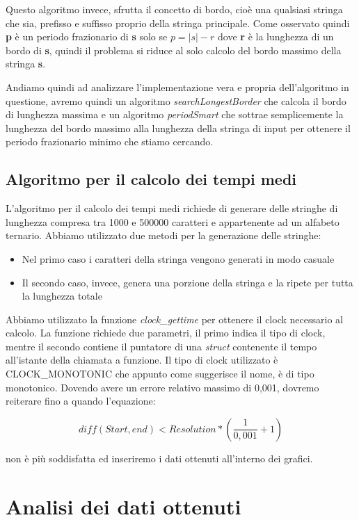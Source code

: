 \documentclass[a4paper,titlepage]{article}
\begin{document}
Questo algoritmo invece, sfrutta il concetto di bordo, cioè una qualsiasi stringa che sia, prefisso e suffisso proprio della stringa principale.
Come osservato quindi \textbf{p} è un periodo frazionario di \textbf{s} solo se \(p = |s| - r\) dove \textbf{r} è la lunghezza di un bordo di \textbf{s}, quindi il problema si riduce al solo calcolo del bordo massimo della stringa \textbf{s}.

Andiamo quindi ad analizzare l’implementazione vera e propria dell’algoritmo in questione, avremo quindi un algoritmo \textit{searchLongestBorder} che calcola il bordo di lunghezza massima e un algoritmo \textit{periodSmart} che sottrae semplicemente la lunghezza del bordo massimo alla lunghezza della stringa di input per ottenere il periodo frazionario minimo che stiamo cercando.

\subsection{Algoritmo per il calcolo dei tempi medi}

L’algoritmo per il calcolo dei tempi medi richiede di generare delle stringhe di lunghezza compresa tra 1000 e 500000 caratteri e appartenente ad un alfabeto ternario.
Abbiamo utilizzato due metodi per la generazione delle stringhe:
\begin{itemize}
  \item Nel primo caso i caratteri della stringa vengono generati in modo casuale
  \item Il secondo caso, invece, genera una porzione della stringa e la ripete per tutta la lunghezza totale
\end{itemize}
Abbiamo utilizzato la funzione \textit{clock\_gettime} per ottenere il clock necessario al calcolo.
La funzione richiede due parametri, il primo indica il tipo di clock, mentre il secondo contiene il puntatore di una \textit{struct} contenente il tempo all’istante della chiamata a funzione.
Il tipo di clock utilizzato è CLOCK\_MONOTONIC che appunto come suggerisce il nome, è di tipo monotonico.
Dovendo avere un errore relativo massimo di 0,001, dovremo reiterare fino a quando l’equazione:

\[diff(Start,end) < Resolution * (\frac{1}{0,001}+1)\]

\noindent non è più soddisfatta ed inseriremo i dati ottenuti all’interno dei grafici.
\newpage

\section{Analisi dei dati ottenuti}
\end{document}
